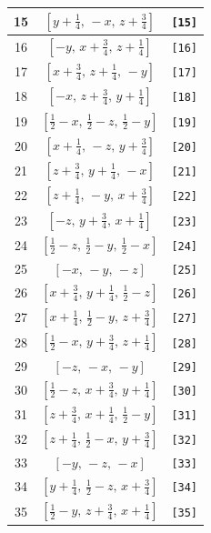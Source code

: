 \documentclass[fleqn,8pt]{jsarticle}
\begin{document}
\begin{longtable}{ccc}
15 & $\left[ y + \frac{1}{4},\, - x,\, z + \frac{3}{4} \right]$ & {\tt [15]} \\ \hline
16 & $\left[ - y,\, x + \frac{3}{4},\, z + \frac{1}{4} \right]$ & {\tt [16]} \\ \hline
17 & $\left[ x + \frac{3}{4},\, z + \frac{1}{4},\, - y \right]$ & {\tt [17]} \\ \hline
18 & $\left[ - x,\, z + \frac{3}{4},\, y + \frac{1}{4} \right]$ & {\tt [18]} \\ \hline
19 & $\left[ \frac{1}{2} - x,\, \frac{1}{2} - z,\, \frac{1}{2} - y \right]$ & {\tt [19]} \\ \hline
20 & $\left[ x + \frac{1}{4},\, - z,\, y + \frac{3}{4} \right]$ & {\tt [20]} \\ \hline
21 & $\left[ z + \frac{3}{4},\, y + \frac{1}{4},\, - x \right]$ & {\tt [21]} \\ \hline
22 & $\left[ z + \frac{1}{4},\, - y,\, x + \frac{3}{4} \right]$ & {\tt [22]} \\ \hline
23 & $\left[ - z,\, y + \frac{3}{4},\, x + \frac{1}{4} \right]$ & {\tt [23]} \\ \hline
24 & $\left[ \frac{1}{2} - z,\, \frac{1}{2} - y,\, \frac{1}{2} - x \right]$ & {\tt [24]} \\ \hline
25 & $\left[ - x,\, - y,\, - z \right]$ & {\tt [25]} \\ \hline
26 & $\left[ x + \frac{3}{4},\, y + \frac{1}{4},\, \frac{1}{2} - z \right]$ & {\tt [26]} \\ \hline
27 & $\left[ x + \frac{1}{4},\, \frac{1}{2} - y,\, z + \frac{3}{4} \right]$ & {\tt [27]} \\ \hline
28 & $\left[ \frac{1}{2} - x,\, y + \frac{3}{4},\, z + \frac{1}{4} \right]$ & {\tt [28]} \\ \hline
29 & $\left[ - z,\, - x,\, - y \right]$ & {\tt [29]} \\ \hline
30 & $\left[ \frac{1}{2} - z,\, x + \frac{3}{4},\, y + \frac{1}{4} \right]$ & {\tt [30]} \\ \hline
31 & $\left[ z + \frac{3}{4},\, x + \frac{1}{4},\, \frac{1}{2} - y \right]$ & {\tt [31]} \\ \hline
32 & $\left[ z + \frac{1}{4},\, \frac{1}{2} - x,\, y + \frac{3}{4} \right]$ & {\tt [32]} \\ \hline
33 & $\left[ - y,\, - z,\, - x \right]$ & {\tt [33]} \\ \hline
34 & $\left[ y + \frac{1}{4},\, \frac{1}{2} - z,\, x + \frac{3}{4} \right]$ & {\tt [34]} \\ \hline
35 & $\left[ \frac{1}{2} - y,\, z + \frac{3}{4},\, x + \frac{1}{4} \right]$ & {\tt [35]} \\ \hline

\end{longtable}
\end{document}
